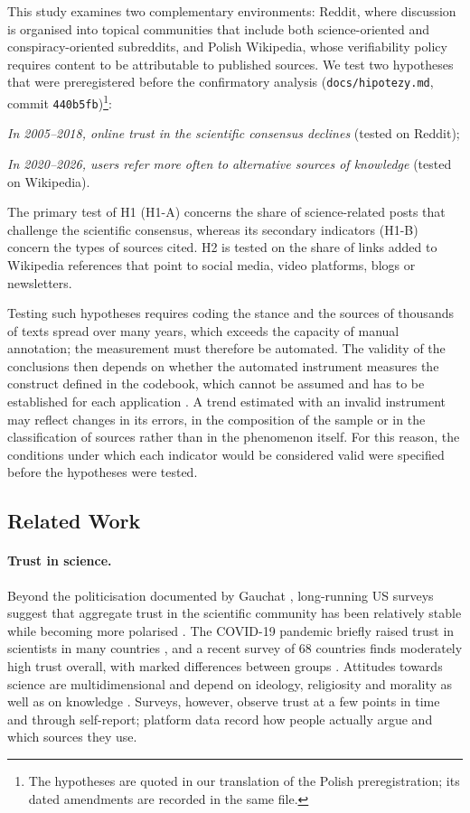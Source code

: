 \documentclass[10pt,a4paper]{article}
\newcommand{\kod}[1]{\texttt{#1}}
\begin{document}
This study examines two complementary environments: Reddit, where discussion is organised
into topical communities that include both science-oriented and conspiracy-oriented
subreddits, and Polish Wikipedia, whose verifiability policy requires content to be
attributable to published sources. We test two hypotheses that were preregistered before
the confirmatory analysis (\kod{docs/hipotezy.md}, commit
\kod{440b5fb})\footnote{The hypotheses are quoted in our translation of the Polish
preregistration; its dated amendments are recorded in the same file.}:
\begin{description}\setlength\itemsep{0pt}
\item[H1:] \emph{In 2005--2018, online trust in the scientific consensus declines}
  (tested on Reddit);
\item[H2:] \emph{In 2020--2026, users refer more often to alternative sources of
  knowledge} (tested on Wikipedia).
\end{description}
The primary test of H1 (H1-A) concerns the share of science-related posts that challenge
the scientific consensus, whereas its secondary indicators (H1-B) concern the types of
sources cited. H2 is tested on the share of links added to Wikipedia references that
point to social media, video platforms, blogs or newsletters.

Testing such hypotheses requires coding the stance and the sources of thousands of texts
spread over many years, which exceeds the capacity of manual annotation; the measurement
must therefore be automated. The validity of the conclusions then depends on whether the
automated instrument measures the construct defined in the codebook, which cannot be
assumed and has to be established for each application \cite{grimmer2013}. A trend
estimated with an invalid instrument may reflect changes in its errors, in the
composition of the sample or in the classification of sources rather than in the
phenomenon itself. For this reason, the conditions under which each indicator would be
considered valid were specified before the hypotheses were tested.

\subsection{Related Work}
\paragraph{Trust in science.}
Beyond the politicisation documented by Gauchat \cite{gauchat2012}, long-running US surveys suggest
that aggregate trust in the scientific community has been relatively stable while becoming
more polarised \cite{krause2019}. The COVID-19 pandemic briefly raised trust in scientists in
many countries \cite{algan2021}, and a recent survey of 68 countries finds moderately high
trust overall, with marked differences between groups \cite{cologna2025}. Attitudes towards
science are multidimensional and depend on ideology, religiosity and morality as well as on
knowledge \cite{rutjens2018}. Surveys, however, observe trust at a few points in time and
through self-report; platform data record how people actually argue and which sources they use.
\end{document}
